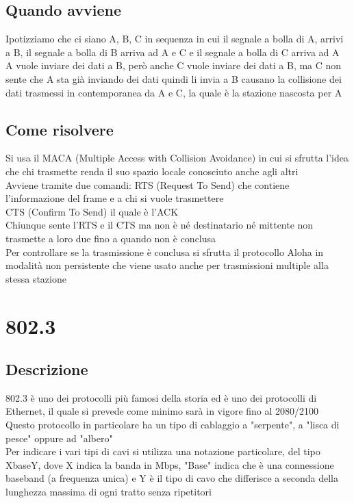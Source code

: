 \documentclass[10pt,oneside,a4paper]{article}
\begin{document}
\subsection{Quando avviene}
Ipotizziamo che ci siano A, B, C in sequenza in cui il segnale a bolla di A, arrivi a B, il segnale a bolla di B arriva ad A e C e il segnale a bolla di C arriva ad A\\
A vuole inviare dei dati a B, però anche C vuole inviare dei dati a B, ma C non sente che A sta già inviando dei dati quindi li invia a B causano la collisione dei dati trasmessi in contemporanea da A e C, la quale è la stazione nascosta per A\\
\subsection{Come risolvere}
Si usa il MACA (Multiple Access with Collision Avoidance) in cui si sfrutta l'idea che chi trasmette renda il suo spazio locale conosciuto anche agli altri\\
Avviene tramite due comandi:
RTS (Request To Send) che contiene l'informazione del frame e a chi si vuole trasmettere\\
CTS (Confirm To Send) il quale è l'ACK\\
Chiunque sente l'RTS e il CTS ma non è né destinatario né mittente non trasmette a loro due fino a quando non è conclusa\\
Per controllare se la trasmissione è conclusa si sfrutta il protocollo Aloha in modalità non persistente che viene usato anche per trasmissioni multiple alla stessa stazione
\section{802.3}
\subsection{Descrizione}
802.3 è uno dei protocolli più famosi della storia ed è uno dei protocolli di Ethernet, il quale si prevede come minimo sarà in vigore fino al 2080/2100\\
Questo protocollo in particolare ha un tipo di cablaggio a "serpente", a "lisca di pesce" oppure ad "albero"\\
Per indicare i vari tipi di cavi si utilizza una notazione particolare, del tipo XbaseY, dove X indica la banda in Mbps, "Base" indica che è una connessione baseband (a frequenza unica) e Y è il tipo di cavo che differisce a seconda della lunghezza massima di ogni tratto senza ripetitori
\end{document}
